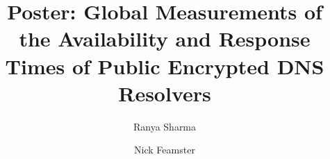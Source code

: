 \documentclass[sigconf]{acmart}
\begin{document}
\sloppy

\title{Poster: Global Measurements of the Availability and Response Times of Public Encrypted DNS Resolvers}

\author{Ranya Sharma}

\author{Nick Feamster}

\renewcommand{\shortauthors}{Ranya Sharma, Nick Feamster}



\maketitle
\begin{sloppypar}



\end{sloppypar}



\balance


\end{document}
